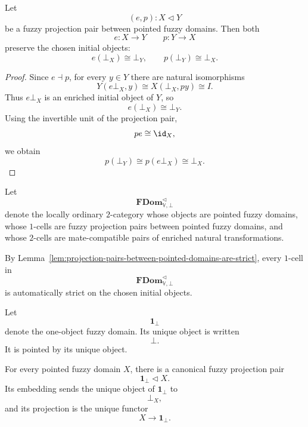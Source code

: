 \begin{lemma}
\label{lem:projection-pairs-between-pointed-domains-are-strict}
Let
\[
    (e,p):X\triangleleft Y
\]
be a fuzzy projection pair between pointed fuzzy domains.  Then both
\[
    e:X\to Y
    \qquad
    p:Y\to X
\]
preserve the chosen initial objects:
\[
    e(\bot_X)\cong \bot_Y,
    \qquad
    p(\bot_Y)\cong \bot_X.
\]
\end{lemma}

\begin{proof}
Since \(e\dashv p\), for every \(y\in Y\) there are natural isomorphisms
\[
    Y(e\bot_X,y)
    \cong
    X(\bot_X,py)
    \cong
    I.
\]
Thus \(e\bot_X\) is an enriched initial object of \(Y\), so
\[
    e(\bot_X)\cong\bot_Y.
\]
Using the invertible unit of the projection pair,
\[
    pe\cong\id_X,
\]
we obtain
\[
    p(\bot_Y)
    \cong
    p(e\bot_X)
    \cong
    \bot_X.
\]
\end{proof}

\begin{definition}
\label{def:pointed-projection-pair-category}
Let
\[
    \mathbf{FDom}^{\triangleleft}_{\mathbb V,\bot}
\]
denote the locally ordinary \(2\)-category whose objects are pointed fuzzy
domains, whose \(1\)-cells are fuzzy projection pairs between pointed fuzzy
domains, and whose \(2\)-cells are mate-compatible pairs of enriched natural
transformations.

By Lemma~\ref{lem:projection-pairs-between-pointed-domains-are-strict}, every
\(1\)-cell in
\[
    \mathbf{FDom}^{\triangleleft}_{\mathbb V,\bot}
\]
is automatically strict on the chosen initial objects.
\end{definition}

\begin{definition}
\label{def:one-point-pointed-fuzzy-domain}
Let
\[
    \mathbf 1_\bot
\]
denote the one-object fuzzy domain.  Its unique object is written
\[
    \bot.
\]
It is pointed by its unique object.
\end{definition}

\begin{lemma}
\label{lem:one-point-domain-embeds-into-pointed-domain}
For every pointed fuzzy domain \(X\), there is a canonical fuzzy projection pair
\[
    \mathbf 1_\bot\triangleleft X.
\]
Its embedding sends the unique object of \(\mathbf 1_\bot\) to
\[
    \bot_X,
\]
and its projection is the unique functor
\[
    X\to\mathbf 1_\bot.
\]
\end{lemma}

